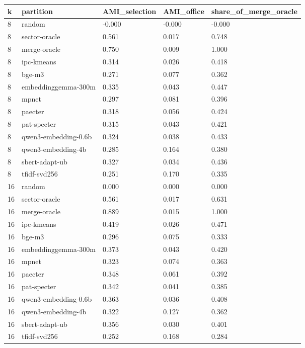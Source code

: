 \begin{tabular}{lllll}
\toprule
k & partition & AMI\_selection & AMI\_office & share\_of\_merge\_oracle \\
\midrule
8 & random & -0.000 & -0.000 & -0.000 \\
8 & sector-oracle & 0.561 & 0.017 & 0.748 \\
8 & merge-oracle & 0.750 & 0.009 & 1.000 \\
8 & ipc-kmeans & 0.314 & 0.026 & 0.418 \\
8 & bge-m3 & 0.271 & 0.077 & 0.362 \\
8 & embeddinggemma-300m & 0.335 & 0.043 & 0.447 \\
8 & mpnet & 0.297 & 0.081 & 0.396 \\
8 & paecter & 0.318 & 0.056 & 0.424 \\
8 & pat-specter & 0.315 & 0.043 & 0.421 \\
8 & qwen3-embedding-0.6b & 0.324 & 0.038 & 0.433 \\
8 & qwen3-embedding-4b & 0.285 & 0.164 & 0.380 \\
8 & sbert-adapt-ub & 0.327 & 0.034 & 0.436 \\
8 & tfidf-svd256 & 0.251 & 0.170 & 0.335 \\
16 & random & 0.000 & 0.000 & 0.000 \\
16 & sector-oracle & 0.561 & 0.017 & 0.631 \\
16 & merge-oracle & 0.889 & 0.015 & 1.000 \\
16 & ipc-kmeans & 0.419 & 0.026 & 0.471 \\
16 & bge-m3 & 0.296 & 0.075 & 0.333 \\
16 & embeddinggemma-300m & 0.373 & 0.043 & 0.420 \\
16 & mpnet & 0.323 & 0.074 & 0.363 \\
16 & paecter & 0.348 & 0.061 & 0.392 \\
16 & pat-specter & 0.342 & 0.041 & 0.385 \\
16 & qwen3-embedding-0.6b & 0.363 & 0.036 & 0.408 \\
16 & qwen3-embedding-4b & 0.322 & 0.127 & 0.362 \\
16 & sbert-adapt-ub & 0.356 & 0.030 & 0.401 \\
16 & tfidf-svd256 & 0.252 & 0.168 & 0.284 \\
\bottomrule
\end{tabular}
